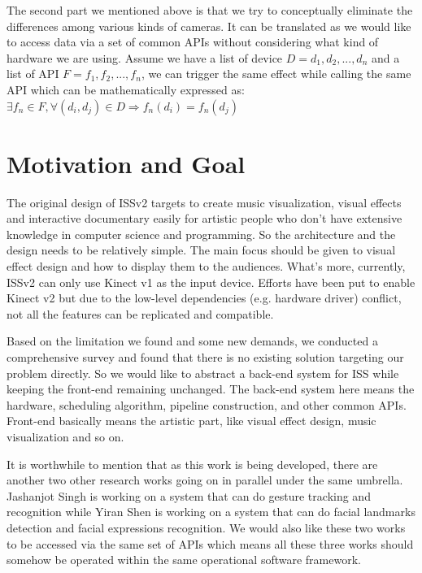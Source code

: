 The second part we mentioned above is that we try to conceptually eliminate the 
differences among various kinds of cameras. It can be translated as we would 
like to access data via a set of common APIs without considering what kind of 
hardware
we are using. Assume we have a list of device $D = {d_1, d_2, ..., d_n}$ and a
list of API $F = {f_1, f_2, ..., f_n}$,
we can trigger the same effect while calling the same API which can be 
mathematically expressed as:
$
\exists f_n \in F, \forall (d_i, d_j) \in D
\Longrightarrow f_{n}(d_i) = f_{n}(d_j)
$

\section{Motivation and Goal}
\label{sec:intro-mot-goal}

The original design of ISSv2 targets to create music visualization, visual
effects and interactive documentary easily for artistic people who don't have 
extensive knowledge in computer science and programming. So the architecture and
the design needs to be relatively simple. The main focus should be given to visual effect
design and how to display them to the audiences.
What's more, currently, ISSv2 can only use Kinect v1 as the input device. Efforts have
been put to enable Kinect v2 but due to the low-level dependencies (e.g.
hardware driver) conflict, not all the features can be replicated and compatible.

Based on the limitation we found and some new demands,
we conducted a comprehensive survey and found that there is no existing solution
targeting our problem directly.
So we would like to abstract a back-end system for ISS while keeping the
front-end remaining unchanged. The back-end system here means the hardware,
scheduling algorithm, pipeline construction, and other common APIs. Front-end
basically means the artistic part, like visual effect design, music
visualization and so on.

It is worthwhile to mention that as this work is being developed, there are
another two other research works going on in parallel under the same umbrella.
Jashanjot Singh is working on a system that can do gesture tracking and
recognition while Yiran Shen is working on a system that can do facial
landmarks detection and facial expressions recognition. We would also like
these two works to be accessed via the same set of APIs which means all these
three works should somehow be operated within the same operational software
framework.

